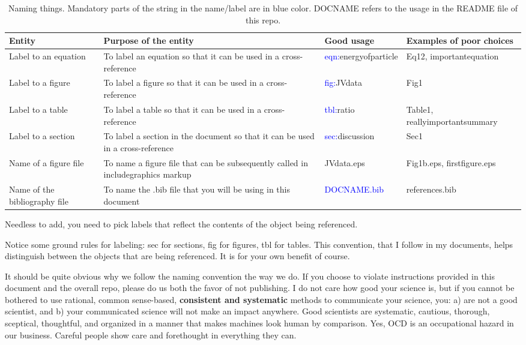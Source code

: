 \documentclass[12 pt]{article}
\begin{document}
\begin{center}
  \begin{longtable}{p{3cm}p{5cm}p{3.5cm}p{2.5cm}}
    \caption{Naming things. Mandatory parts of the string in the name/label are in blue color. DOCNAME refers to the usage in the README file of this repo.} \label{tbl:namingthings}\\
    \hline
    \textbf{Entity}  & \textbf{Purpose of the entity} &  \textbf{Good usage} & \textbf{Examples of poor choices} \\\hline
    Label to an equation & To label an equation so that it can be used in a cross-reference & \textcolor{blue}{eqn:}energyofparticle & Eq12, importantequation \\\hline
    Label to a figure & To label a figure so that it can be used in a cross-reference & \textcolor{blue}{fig:}JVdata & Fig1 \\\hline
    Label to a table & To label a table so that it can be used in a cross-reference & \textcolor{blue}{tbl:}ratio & Table1, reallyimportantsummary \\\hline
    Label to a section & To label a section in the document so that it can be used in a cross-reference & \textcolor{blue}{sec:}discussion & Sec1 \\\hline
    Name of a figure file & To name a figure file that can be subsequently called in includegraphics markup & JVdata.eps & Fig1b.eps, firstfigure.eps\\\hline
    Name of the bibliography file & To name the .bib file that you will be using in this document & \textcolor{blue}{DOCNAME.bib} & references.bib \\\hline
  \end{longtable}
\end{center}

Needless to add, you need to pick labels that reflect the contents of the object being referenced.

Notice some ground rules for labeling: sec for sections, fig for figures, tbl for tables. This convention, that I follow in my documents, helps distinguish between the objects that are being referenced. It is for your own benefit of course.

It should be quite obvious why we follow the naming convention the way we do. If you choose to violate instructions provided in this document and the overall repo, please do us both the favor of not publishing. I do not care how good your science is, but if you cannot be bothered to use rational, common sense-based, \textbf{consistent and systematic} methods to communicate your science, you: a) are not a good scientist, and b) your communicated science will not make an impact anywhere. Good scientists are systematic, cautious, thorough, sceptical, thoughtful, and organized in a manner that makes machines look human by comparison. Yes, OCD is an occupational hazard in our business. Careful people show care and forethought in everything they can.
\end{document}
